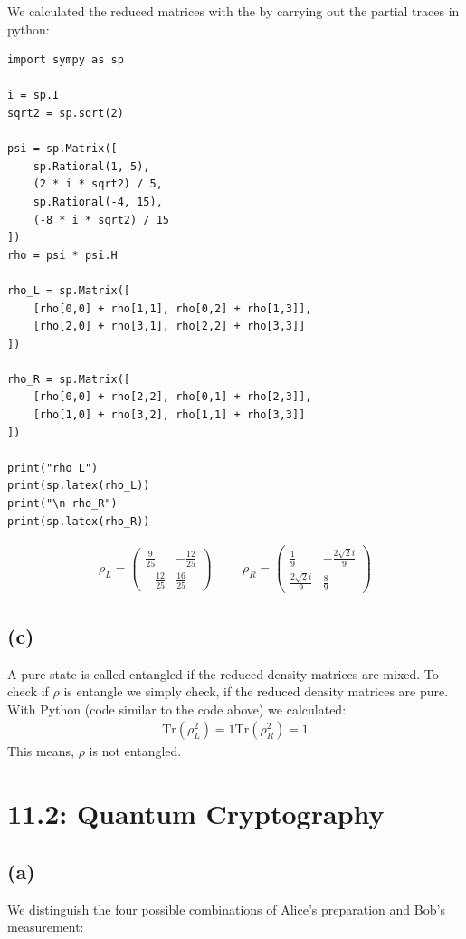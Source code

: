 \documentclass{article}
\begin{document}
We calculated the reduced matrices with the by carrying out the partial traces in python:
\begin{verbatim}
import sympy as sp

i = sp.I
sqrt2 = sp.sqrt(2)

psi = sp.Matrix([
    sp.Rational(1, 5),
    (2 * i * sqrt2) / 5,
    sp.Rational(-4, 15),
    (-8 * i * sqrt2) / 15
])
rho = psi * psi.H

rho_L = sp.Matrix([
    [rho[0,0] + rho[1,1], rho[0,2] + rho[1,3]],
    [rho[2,0] + rho[3,1], rho[2,2] + rho[3,3]]
])

rho_R = sp.Matrix([
    [rho[0,0] + rho[2,2], rho[0,1] + rho[2,3]],
    [rho[1,0] + rho[3,2], rho[1,1] + rho[3,3]]
])

print("rho_L")
print(sp.latex(rho_L))
print("\n rho_R")
print(sp.latex(rho_R))
\end{verbatim}

\begin{align}
    \rho_L=
    \begin{pmatrix}
    \frac{9}{25} & - \frac{12}{25}\\
    - \frac{12}{25} & \frac{16}{25}
    \end{pmatrix} \hspace{1cm}
    \rho_R=
    \begin{pmatrix}\frac{1}{9} & - \frac{2 \sqrt{2} i}{9}\\\frac{2 \sqrt{2} i}{9} & \frac{8}{9}\end{pmatrix}
\end{align}

\subsection*{(c)}
A pure state is called entangled if the reduced density matrices are mixed. To check if $\rho$ is entangle we simply check, if the reduced density matrices are pure.
With Python (code similar to the code above) we calculated:
\begin{align}
        \text{Tr}(\rho_L^2)=1
        \text{Tr}(\rho_R^2)=1
\end{align}
This means, $\rho$ is not entangled.

\section*{11.2: Quantum Cryptography}
\subsection*{(a)}
We distinguish the four possible combinations of Alice's preparation and Bob's measurement:
\end{document}
